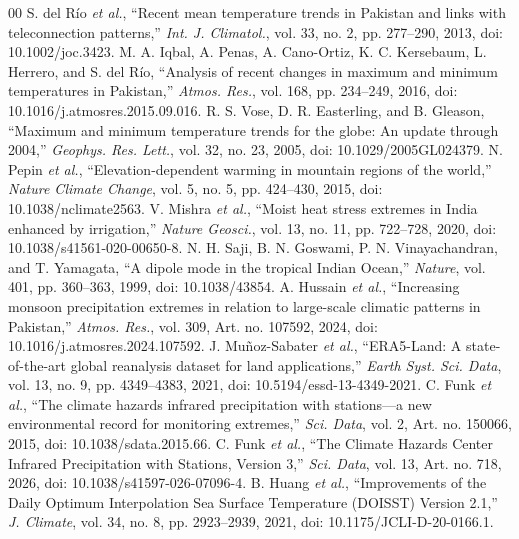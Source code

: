 \documentclass[conference]{IEEEtran}
\begin{document}
\begin{thebibliography}{00}
 S. del R\'{i}o \textit{et al.}, ``Recent mean temperature trends in Pakistan and links with teleconnection patterns,'' \textit{Int. J. Climatol.}, vol. 33, no. 2, pp. 277--290, 2013, doi: 10.1002/joc.3423.
 M. A. Iqbal, A. Penas, A. Cano-Ortiz, K. C. Kersebaum, L. Herrero, and S. del R\'{i}o, ``Analysis of recent changes in maximum and minimum temperatures in Pakistan,'' \textit{Atmos. Res.}, vol. 168, pp. 234--249, 2016, doi: 10.1016/j.atmosres.2015.09.016.
 R. S. Vose, D. R. Easterling, and B. Gleason, ``Maximum and minimum temperature trends for the globe: An update through 2004,'' \textit{Geophys. Res. Lett.}, vol. 32, no. 23, 2005, doi: 10.1029/2005GL024379.
 N. Pepin \textit{et al.}, ``Elevation-dependent warming in mountain regions of the world,'' \textit{Nature Climate Change}, vol. 5, no. 5, pp. 424--430, 2015, doi: 10.1038/nclimate2563.
 V. Mishra \textit{et al.}, ``Moist heat stress extremes in India enhanced by irrigation,'' \textit{Nature Geosci.}, vol. 13, no. 11, pp. 722--728, 2020, doi: 10.1038/s41561-020-00650-8.
 N. H. Saji, B. N. Goswami, P. N. Vinayachandran, and T. Yamagata, ``A dipole mode in the tropical Indian Ocean,'' \textit{Nature}, vol. 401, pp. 360--363, 1999, doi: 10.1038/43854.
 A. Hussain \textit{et al.}, ``Increasing monsoon precipitation extremes in relation to large-scale climatic patterns in Pakistan,'' \textit{Atmos. Res.}, vol. 309, Art. no. 107592, 2024, doi: 10.1016/j.atmosres.2024.107592.
 J. Mu\~{n}oz-Sabater \textit{et al.}, ``ERA5-Land: A state-of-the-art global reanalysis dataset for land applications,'' \textit{Earth Syst. Sci. Data}, vol. 13, no. 9, pp. 4349--4383, 2021, doi: 10.5194/essd-13-4349-2021.
 C. Funk \textit{et al.}, ``The climate hazards infrared precipitation with stations---a new environmental record for monitoring extremes,'' \textit{Sci. Data}, vol. 2, Art. no. 150066, 2015, doi: 10.1038/sdata.2015.66.
 C. Funk \textit{et al.}, ``The Climate Hazards Center Infrared Precipitation with Stations, Version 3,'' \textit{Sci. Data}, vol. 13, Art. no. 718, 2026, doi: 10.1038/s41597-026-07096-4.
 B. Huang \textit{et al.}, ``Improvements of the Daily Optimum Interpolation Sea Surface Temperature (DOISST) Version 2.1,'' \textit{J. Climate}, vol. 34, no. 8, pp. 2923--2939, 2021, doi: 10.1175/JCLI-D-20-0166.1.

\end{thebibliography}
\end{document}

